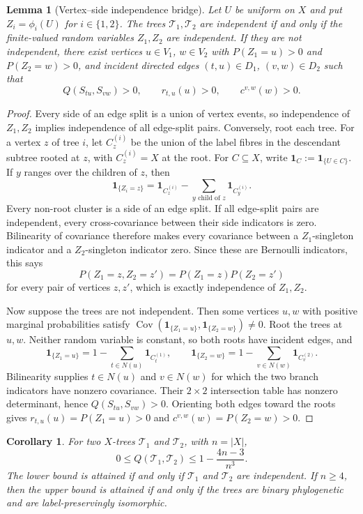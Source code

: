 \documentclass[pdflatex,sn-mathphys-num]{sn-jnl}
\theoremstyle{thmstyleone}
\newtheorem{lemma}{Lemma}
\newtheorem{corollary}{Corollary}
\begin{document}
\begin{lemma}[Vertex--side independence bridge]
\label{lem:vertex-side-bridge}
Let $U$ be uniform on $X$ and put $Z_i=\phi_i(U)$ for $i\in\{1,2\}$.
The trees $\mathcal T_1,\mathcal T_2$ are independent if and only if the
finite-valued random variables $Z_1,Z_2$ are independent.  If they are not
independent, there exist vertices $u\in V_1$, $w\in V_2$ with
$P(Z_1=u)>0$ and $P(Z_2=w)>0$, and
incident directed edges $(t,u)\in D_1$, $(v,w)\in D_2$ such that
\[
Q(S_{tu},S_{vw})>0,
\qquad r_{t,u}(u)>0,
\qquad c^{v,w}(w)>0.
\]
\end{lemma}

\begin{proof}
Every side of an edge split is a union of vertex events, so independence of
$Z_1,Z_2$ implies independence of all edge-split pairs.  Conversely, root
each tree.  For a vertex $z$ of tree $i$, let $C_z^{(i)}$ be the union of
the label fibres in the descendant subtree rooted at $z$, with
$C_z^{(i)}=X$ at the root.  For $C\subseteq X$, write
$\mathbf 1_C:=\mathbf 1_{\{U\in C\}}$.  If $y$ ranges over the
children of $z$, then
\[
\mathbf 1_{\{Z_i=z\}}=\mathbf 1_{C_z^{(i)}}
-\sum_{y\text{ child of }z}\mathbf 1_{C_y^{(i)}}.
\]
Every non-root cluster is a side of an edge split.  If all edge-split pairs
are independent, every cross-covariance between their side indicators is
zero.  Bilinearity of covariance therefore makes every covariance between a
$Z_1$-singleton indicator and a $Z_2$-singleton indicator zero.  Since these
are Bernoulli indicators, this says
\[
P(Z_1=z,Z_2=z')=P(Z_1=z)P(Z_2=z')
\]
for every pair of vertices $z,z'$, which is exactly independence of
$Z_1,Z_2$.

Now suppose the trees are not independent.  Then some vertices $u,w$ with
positive marginal probabilities satisfy
$\operatorname{Cov}(\mathbf 1_{\{Z_1=u\}},
\mathbf 1_{\{Z_2=w\}})\ne0$.  Root the trees at $u,w$.  Neither random
variable is constant, so both roots have incident edges, and
\[
\mathbf 1_{\{Z_1=u\}}=1-\sum_{t\in N(u)}\mathbf 1_{C_t^{(1)}},
\qquad
\mathbf 1_{\{Z_2=w\}}=1-\sum_{v\in N(w)}\mathbf 1_{C_v^{(2)}}.
\]
Bilinearity supplies $t\in N(u)$ and $v\in N(w)$ for which the two branch
indicators have nonzero covariance.  Their $2\times2$ intersection table has
nonzero determinant, hence $Q(S_{tu},S_{vw})>0$.  Orienting both edges toward
the roots gives
$r_{t,u}(u)=P(Z_1=u)>0$ and $c^{v,w}(w)=P(Z_2=w)>0$.
\end{proof}

\begin{corollary}\label{cor:Q-bounds}
For two $X$-trees $\mathcal T_1$ and $\mathcal T_2$, with $n=|X|$,
\[
0\le Q(\mathcal T_1,\mathcal T_2)\le1-\frac{4n-3}{n^3}.
\]
The lower bound is attained if and only if $\mathcal T_1$ and
$\mathcal T_2$ are independent.  If $n\ge4$, then the upper bound is
attained if and only if the trees are binary phylogenetic and are
label-preservingly isomorphic.
\end{corollary}
\end{document}
